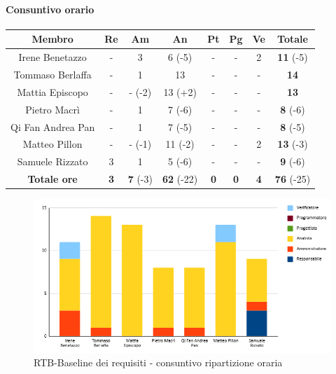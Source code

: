 \paragraph{Consuntivo orario}
\begin{center}
	\renewcommand{\arraystretch}{1.8}
	\begin{tabular}{ |c|c|c|c|c|c|c|c| }
	\hline
	\textbf{Membro} & \textbf{Re} & \textbf{Am} &  \textbf{An} &  \textbf{Pt} &  \textbf{Pg} &  \textbf{Ve} &  \textbf{Totale}\\
    \hline
    Irene Benetazzo   & - & 3      & 6  (-5) & - & - & 2 & \textbf{11} (-5) \\
    \hline
    Tommaso Berlaffa  & - & 1      & 13      & - & - & - & \textbf{14}      \\
    \hline
    Mattia Episcopo   & - & - (-2) & 13 (+2) & - & - & - & \textbf{13}      \\
    \hline
    Pietro Macrì      & - & 1      & 7  (-6) & - & - & - & \textbf{8} (-6)  \\
    \hline
    Qi Fan Andrea Pan & - & 1      & 7  (-5) & - & - & - & \textbf{8} (-5)  \\
    \hline
    Matteo Pillon     & - & - (-1) & 11 (-2) & - & - & 2 & \textbf{13} (-3) \\
    \hline
    Samuele Rizzato   & 3 & 1      & 5  (-6) & - & - & - & \textbf{9} (-6)  \\
    \hline
    \textbf{Totale ore} & \textbf{3} & \textbf{7} (-3) &  \textbf{62} (-22) &  \textbf{0} &  \textbf{0} &  \textbf{4} &  \textbf{76} (-25)\\
    \hline
	\end{tabular}
\end{center}
\begin{figure}[H]
    \centering\includegraphics[width=\textwidth, height=\textheight,keepaspectratio]{images/consuntivo/RTB-requisiti-ore.png}
    \caption{RTB-Baseline dei requisiti - consuntivo ripartizione oraria}
\end{figure}

